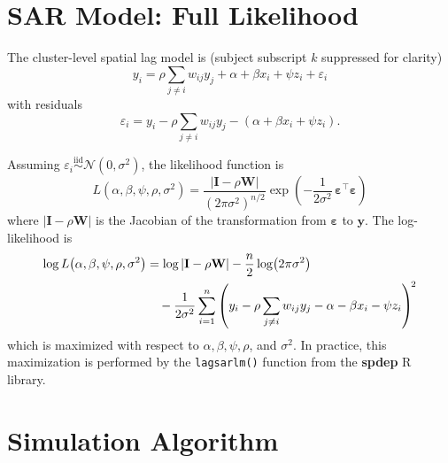 \documentclass{article}[11pt]
\begin{document}
\section{SAR Model: Full Likelihood}\label{appendix:SARLikelihood}

The cluster-level spatial lag model is (subject subscript $k$ suppressed for clarity)
\begin{equation}
    y_i = \rho \sum_{j \neq i} w_{ij} y_j + \alpha + \beta x_i + \psi z_i + \varepsilon_i
\end{equation}
with residuals
\begin{equation}
    \varepsilon_i = y_i - \rho \sum_{j \neq i} w_{ij} y_j - \left(\alpha + \beta x_i + \psi z_i\right).
\end{equation}

Assuming $\varepsilon_i \overset{\text{iid}}{\sim} \mathcal{N}(0,\sigma^2)$, the likelihood function is
\begin{equation}
    L\!\left(\alpha,\beta,\psi,\rho,\sigma^2\right)
    = \frac{|\mathbf{I} - \rho\mathbf{W}|}{\left(2\pi\sigma^2\right)^{n/2}}
      \exp\!\left(-\frac{1}{2\sigma^2}\,\boldsymbol{\varepsilon}^{\top}\boldsymbol{\varepsilon}\right)
\end{equation}
where $|\mathbf{I}-\rho\mathbf{W}|$ is the Jacobian of the transformation from $\boldsymbol{\varepsilon}$ to $\mathbf{y}$. The log-likelihood is
\begin{align}
    \log L\!\left(\alpha,\beta,\psi,\rho,\sigma^2\right)
    &= \log|\mathbf{I} - \rho\mathbf{W}|
       - \frac{n}{2}\log\!\left(2\pi\sigma^2\right) \notag \\
    &\quad - \frac{1}{2\sigma^2}
        \sum_{i=1}^{n}
        \left(y_i - \rho\sum_{j \neq i}w_{ij}y_j - \alpha - \beta x_i - \psi z_i\right)^{\!2}
\end{align}
which is maximized with respect to $\alpha, \beta, \psi, \rho$, and $\sigma^2$. In practice, this maximization is performed by the \texttt{lagsarlm()} function from the \textbf{spdep} R library\cite{bivand_r_2022}.

\section{Simulation Algorithm}\label{appendix:SimAlgorithm}
\end{document}
